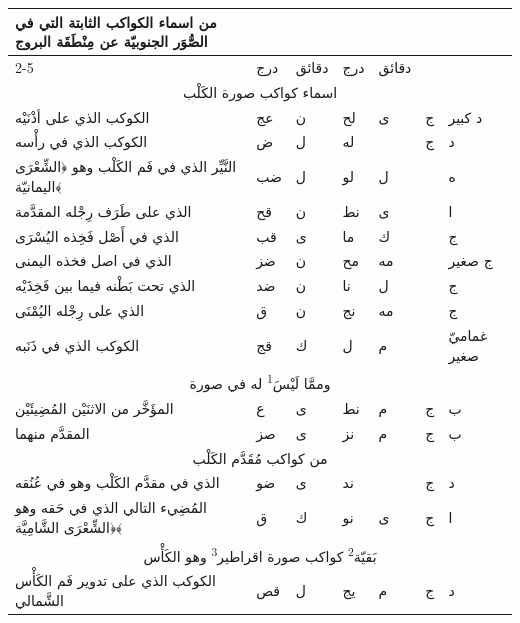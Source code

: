 \documentclass[11pt]{article}
\newcommand{\AbjadZero}{{\NallinoSigns\symbol{"E000}}}
\begin{document}
\begin{Arabic}\begin{tabular}{|p{84mm}|>{\centering\arraybackslash}p{9mm}|>{\centering\arraybackslash}p{9mm}|>{\centering\arraybackslash}p{9mm}|>{\centering\arraybackslash}p{9mm}|>{\centering\arraybackslash}p{14mm}|>{\centering\arraybackslash}p{17mm}|}\hline
\multirow{2}{*}{\parbox{80mm}{\centering من اسماء الكواكب الثابتة التي في الصُّوَر الجنوبيّة عن مِنْطَقَة البروج}} & \multicolumn{2}{c|}{الطول} & \multicolumn{2}{c|}{العرض} & \multirow{2}{*}{\parbox{13mm}{\centering\small علامات الجهة}} & \multirow{2}{*}{\parbox{16mm}{\centering\small مراتب العظمة}} \\ \cline{2-5}
 & {\small درج} & {\small دقائق} & {\small درج} & {\small دقائق} & & \\ \hline
\multicolumn{7}{|c|}{\large اسماء كواكب صورة الكَلْب} \\ \hline
الكوكب الذي على أذْنَيْه & عج & ن & لح & ى & ج & د كبير \\
الكوكب الذي في رأْسه & ض & ل & له & \AbjadZero{} & ج & د \\
النَّيِّر الذي في فَم الكَلْب وهو ﴿الشِّعْرَى اليمانيّة﴾ & ضب & ل & لو & ل &  & ه \\
الذي على طَرَف رِجْله المقدَّمة & قح & ن & نط & ى &  & ا \\
الذي في أَصْل فَخِذه اليُسْرَى & قب & ى & ما & ك &  & ج \\
الذي في اصل فخذه اليمنى & ضز & ن & مح & مه &  & ج صغير \\
الذي تحت بَطْنه فيما بين فَخِذَيْه & ضد & ن & نا & ل &  & ج \\
الذي على رِجْله اليُمْنَى & ق & ن & نج & مه &  & ج \\
الكوكب الذي في ذَنَبه & قج & ك & ل & م &  & غماميّ صغير \\
\multicolumn{7}{|c|}{وممَّا لَيْسَ\textsuperscript{1} له في صورة} \\
المؤَخَّر من الاثنَيْن المُضِيئَيْن & ع & ى & نط & م & ج & ب \\
المقدَّم منهما & صز & ى & نز & م & ج & ب \\
\hline
\multicolumn{7}{|c|}{\large من كواكب مُقَدَّم الكَلْب} \\ \hline
الذي في مقدَّم الكَلْب وهو في عُنُقه & ضو & ى & ند & \AbjadZero{} & ج & د \\
المُضِيء التالي الذي في حَقه وهو ﴿الشِّعْرَى الشَّامِيَّة﴾ & ق & ك & نو & ى & ج & ا \\
\hline
\multicolumn{7}{|c|}{\parbox{168mm}{\centering\large بَقيّة\textsuperscript{2} كواكب صورة اقراطير\textsuperscript{3} وهو الكَأْس}} \\ \hline
الكوكب الذي على تدوير فَم الكَأْس الشَّمالي & قص & ل & يج & م & ج & د \\
\hline
\end{tabular}\end{Arabic}
\end{document}
